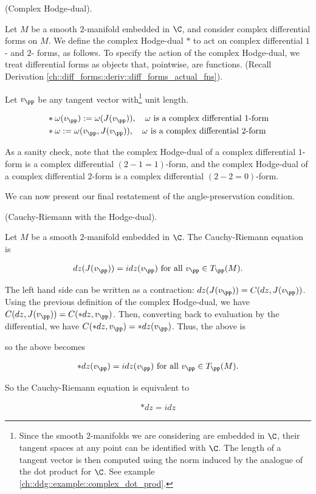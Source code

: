 \begin{defn}
    (Complex Hodge-dual).

    Let $M$ be a smooth $2$-manifold embedded in $\C$, and consider complex differential forms on $M$. We define the complex Hodge-dual $*$ to act on complex differential $1$- and $2$- forms, as follows. To specify the action of the complex Hodge-dual, we treat differential forms as objects that, pointwise, are functions. (Recall Derivation \ref{ch::diff_forms::deriv::diff_forms_actual_fns}).
    
    Let $v_\pp$ be any tangent vector with\footnote{Since the smooth $2$-manifolds we are considering are embedded in $\C$, their tangent spaces at any point can be identified with $\C$. The length of a tangent vector is then computed using the norm induced by the analogue of the dot product for $\C$. See example \ref{ch::ddg::example::complex_dot_prod}.} unit length.
    
    \begin{align*}
        &*\omega(v_\pp) := \omega(J(v_\pp)), \quad \text{$\omega$ is a complex differential $1$-form} \\
        &*\omega := \omega(v_\pp, J(v_\pp)), \quad \text{$\omega$ is a complex differential $2$-form}
    \end{align*}
    
    As a sanity check, note that the complex Hodge-dual of a complex differential $1$-form is a complex differential $(2 - 1 = 1)$-form, and the complex Hodge-dual of a complex differential $2$-form is a complex differential $(2 - 2 = 0)$-form.
\end{defn}

We can now present our final restatement of the angle-preservation condition.

\begin{theorem}
    (Cauchy-Riemann with the Hodge-dual).

     Let $M$ be a smooth $2$-manifold embedded in $\C$. The Cauchy-Riemann equation is
     
     \begin{align*}
        dz(J(v_\pp)) = idz(v_\pp) \text{ for all $v_\pp \in T_\pp(M)$}.
    \end{align*}
    
    The left hand side can be written as a contraction: $dz(J(v_\pp)) = C(dz, J(v_\pp))$. Using the previous definition of the complex Hodge-dual, we have $C(dz, J(v_\pp)) = C(*dz, v_\pp)$. Then, converting back to evaluation by the differential, we have $C(*dz, v_\pp) = *dz(v_\pp)$. Thus, the above is
    
    so the above becomes
    
    \begin{align*}
        *dz(v_\pp) = idz(v_\pp) \text{ for all $v_\pp \in T_\pp(M)$}.
    \end{align*}
    
    So the Cauchy-Riemann equation is equivalent to
    
    \begin{align*}
        \boxed
        {
            *dz = idz
        }
    \end{align*}
\end{theorem}

